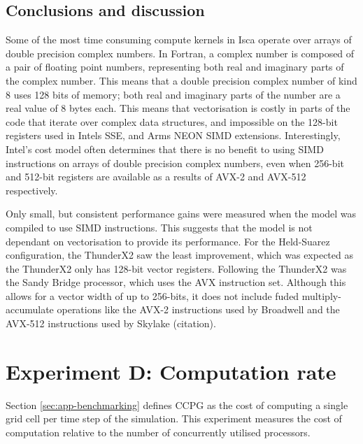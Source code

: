 \documentclass[a4paper,11pt]{report}
\begin{document}
\subsection{Conclusions and discussion}
Some of the most time consuming compute kernels in Isca operate over arrays of double precision complex numbers. In Fortran, a complex number is composed of a pair of floating point numbers, representing both real and imaginary parts of the complex number. This means that a double precision complex number of kind 8 uses 128 bits of memory; both real and imaginary parts of the number are a real value of 8 bytes each. This means that vectorisation is costly in parts of the code that iterate over complex data structures, and impossible on the 128-bit registers used in Intels SSE, and Arms NEON SIMD extensions. Interestingly, Intel's cost model often determines that there is no benefit to using SIMD instructions on arrays of double precision complex numbers, even when 256-bit and 512-bit registers are available as a results of AVX-2 and AVX-512 respectively.
\par
Only small, but consistent performance gains were measured when the model was compiled to use SIMD instructions. This suggests that the model is not dependant on vectorisation to provide its performance. For the Held-Suarez configuration, the ThunderX2 saw the least improvement, which was expected as the ThunderX2 only has 128-bit vector registers. Following the ThunderX2 was the Sandy Bridge processor, which uses the AVX instruction set. Although this allows for a vector width of up to 256-bits, it does not include fuded multiply-accumulate operations like the AVX-2 instructions used by Broadwell and the AVX-512 instructions used by Skylake (citation).



\section{Experiment D: Computation rate}
Section \ref{sec:app-benchmarking} defines CCPG as the cost of computing a single grid cell per time step of the simulation. This experiment measures the cost of computation relative to the number of concurrently utilised processors. %
\label{sec:comm-analysis}
\end{document}
